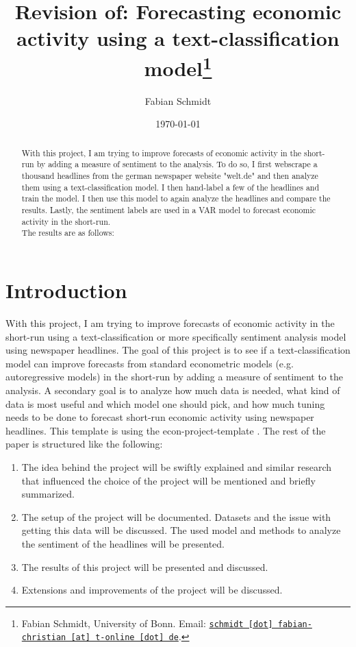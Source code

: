 \documentclass[11pt, a4paper, leqno]{article}
\begin{document}
\title{Revision of: Forecasting economic activity using a text-classification model\thanks{Fabian Schmidt, University of Bonn. Email: \href{mailto:schmidt.fabian-christian@t-online.de}{\nolinkurl{schmidt [dot] fabian-christian [at] t-online [dot] de}}.}}

\author{Fabian Schmidt}

\date{
    \today
}

\maketitle


\begin{abstract}
    With this project, I am trying to improve forecasts of economic activity in the short-run by adding a measure of sentiment to the analysis. To do so, I first webscrape a thousand headlines from the german newspaper website "welt.de" and then analyze them using a text-classification model.
    I then hand-label a few of the headlines and train the model. I then use this model to again analyze the headlines and compare the results. Lastly, the sentiment labels are used in a VAR model to forecast economic activity in the short-run.\\
    The results are as follows:
\end{abstract}

\clearpage


\section{Introduction} %
\label{sec:introduction}

With this project, I am trying to improve forecasts of economic activity in the short-run using a text-classification or more specifically sentiment analysis model using newspaper headlines. The goal of this project is to see if a text-classification model can improve forecasts from standard econometric models (e.g. autoregressive models) in the short-run by adding a measure of sentiment to the analysis. 
A secondary goal is to analyze how much data is needed, what kind of data is most useful and which model one should pick, and how much tuning needs to be done to forecast short-run economic activity using newspaper headlines.
This template is using the econ-project-template \citet{GaudeckerEconProjectTemplates}.
The rest of the paper is structured like the following:
\begin{enumerate}
    \item The idea behind the project will be swiftly explained and similar research that influenced the choice of the project will be mentioned and briefly summarized.
    \item The setup of the project will be documented. Datasets and the issue with getting this data will be discussed. The used model and methods to analyze the sentiment of the headlines will be presented.
    \item The results of this project will be presented and discussed.
    \item Extensions and improvements of the project will be discussed.
\end{enumerate}
\end{document}
